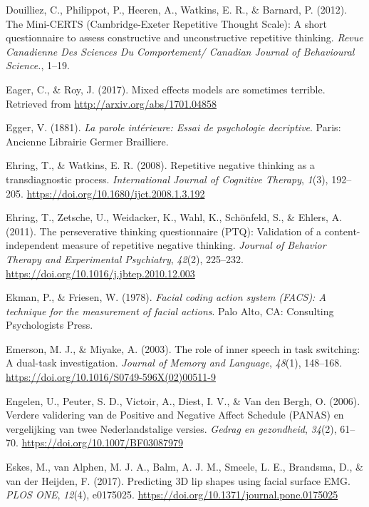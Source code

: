 \documentclass[a4paper,12pt,twoside,onecolumn,openright,final,oldfontcommands]{memoir}
\begin{document}
\leavevmode\hypertarget{ref-Douilliez2012}{}%
Douilliez, C., Philippot, P., Heeren, A., Watkins, E. R., \& Barnard, P. (2012). The Mini-CERTS (Cambridge-Exeter Repetitive Thought Scale): A short questionnaire to assess constructive and unconstructive repetitive thinking. \emph{Revue Canadienne Des Sciences Du Comportement/ Canadian Journal of Behavioural Science.}, 1--19.

\leavevmode\hypertarget{ref-eager_mixed_2017}{}%
Eager, C., \& Roy, J. (2017). Mixed effects models are sometimes terrible. Retrieved from \url{http://arxiv.org/abs/1701.04858}

\leavevmode\hypertarget{ref-egger_parole_1881}{}%
Egger, V. (1881). \emph{La parole intérieure: Essai de psychologie decriptive}. Paris: Ancienne Librairie Germer Brailliere.

\leavevmode\hypertarget{ref-ehring_repetitive_2008}{}%
Ehring, T., \& Watkins, E. R. (2008). Repetitive negative thinking as a transdiagnostic process. \emph{International Journal of Cognitive Therapy}, \emph{1}(3), 192--205. \url{https://doi.org/10.1680/ijct.2008.1.3.192}

\leavevmode\hypertarget{ref-Ehring2011}{}%
Ehring, T., Zetsche, U., Weidacker, K., Wahl, K., Schönfeld, S., \& Ehlers, A. (2011). The perseverative thinking questionnaire (PTQ): Validation of a content-independent measure of repetitive negative thinking. \emph{Journal of Behavior Therapy and Experimental Psychiatry}, \emph{42}(2), 225--232. \url{https://doi.org/10.1016/j.jbtep.2010.12.003}

\leavevmode\hypertarget{ref-ekman_facial_1978}{}%
Ekman, P., \& Friesen, W. (1978). \emph{Facial coding action system (FACS): A technique for the measurement of facial actions}. Palo Alto, CA: Consulting Psychologists Press.

\leavevmode\hypertarget{ref-emerson_role_2003}{}%
Emerson, M. J., \& Miyake, A. (2003). The role of inner speech in task switching: A dual-task investigation. \emph{Journal of Memory and Language}, \emph{48}(1), 148--168. \url{https://doi.org/10.1016/S0749-596X(02)00511-9}

\leavevmode\hypertarget{ref-engelen_verdere_2006}{}%
Engelen, U., Peuter, S. D., Victoir, A., Diest, I. V., \& Van den Bergh, O. (2006). Verdere validering van de Positive and Negative Affect Schedule (PANAS) en vergelijking van twee Nederlandstalige versies. \emph{Gedrag en gezondheid}, \emph{34}(2), 61--70. \url{https://doi.org/10.1007/BF03087979}

\leavevmode\hypertarget{ref-eskes_predicting_2017}{}%
Eskes, M., van Alphen, M. J. A., Balm, A. J. M., Smeele, L. E., Brandsma, D., \& van der Heijden, F. (2017). Predicting 3D lip shapes using facial surface EMG. \emph{PLOS ONE}, \emph{12}(4), e0175025. \url{https://doi.org/10.1371/journal.pone.0175025}
\end{document}
